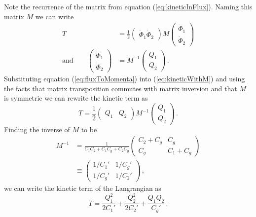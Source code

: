 Note the recurrence of the matrix from equation (\ref{eq:kineticInFlux}).
Naming this matrix $M$ we can write
\begin{align}
  T &=
    \frac{1}{2}
    \left( \begin{array}{cc} \dot{\Phi}_1 \dot{\Phi}_2 \end{array} \right)
    M
    \left( \begin{array}{c} \dot{\Phi}_1 \\ \dot{\Phi}_2 \end{array} \right)
    \label{eq:kineticWithM} \\
  \text{and} \qquad
  \left( \begin{array}{c} \dot{\Phi}_1 \\ \dot{\Phi}_2 \end{array} \right)
  &= M^{-1}
  \left( \begin{array}{c} Q_1 \\ Q_2 \end{array} \right) \, .
  \label{eq:fluxToMomenta}
\end{align}
Substituting equation (\ref{eq:fluxToMomenta}) into (\ref{eq:kineticWithM}) and using the facts that matrix transposition commutes with matrix inversion and that $M$ is symmetric we can rewrite the kinetic term as
\begin{equation}
  T =
  \frac{1}{2} \left( \begin{array}{cc} Q_1 & Q_2 \end{array} \right)
  M^{-1}
  \left( \begin{array}{c} Q_1 \\ Q_2 \end{array} \right) \, .
\end{equation}
Finding the inverse of $M$ to be
\begin{align}
  M^{-1}
  &= \frac{1}{C_1 C_2 + C_1 C_g + C_2 C_g}
    \left( \begin{array}{cc} C_2 + C_g & C_g \\ C_g & C_1 + C_g \end{array} \right) \nonumber \\
  &\equiv \left(
    \begin{array}{cc} 1/C_1' & 1/C_g' \\ 1/C_g' & 1/C_2' \end{array}
    \right) \, ,
\end{align}
we can write the kinetic term of the Langrangian as
\begin{equation}
  T =
      \frac{Q_1^2}{2 C_1'}
    + \frac{Q_2^2}{2 C_2'}
    + \frac{Q_1 Q_2}{C_g'} \, . \label{eq:kineticInP}
\end{equation}

